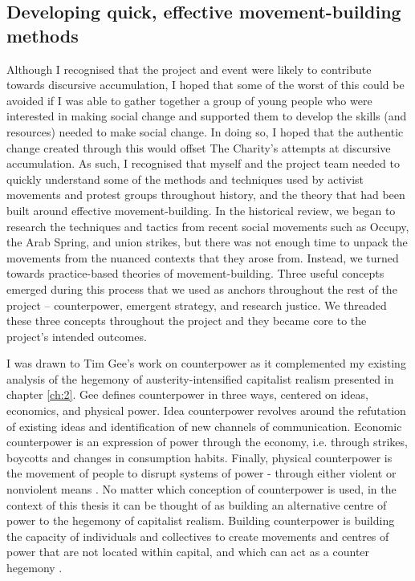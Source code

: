 \subsection{Developing quick, effective movement-building methods}
Although I recognised that the project and event were likely to contribute towards discursive accumulation, I hoped that some of the worst of this could be avoided if I was able to gather together a group of young people who were interested in making social change and supported them to develop the skills (and resources) needed to make social change. In doing so, I hoped that the authentic change created through this would offset The Charity's attempts at discursive accumulation. As such, I recognised that myself and the project team needed to quickly understand some of the methods and techniques used by activist movements and protest groups throughout history, and the theory that had been built around effective movement-building. In the historical review, we began to research the techniques and tactics from recent social movements such as Occupy, the Arab Spring, and union strikes, but there was not enough time to unpack the movements from the nuanced contexts that they arose from. Instead, we turned towards practice-based theories of movement-building. Three useful concepts emerged during this process that we used as anchors throughout the rest of the project – counterpower, emergent strategy, and research justice. We threaded these three concepts throughout the project and they became core to the project's intended outcomes. 

I was drawn to Tim Gee’s work on counterpower \citep{gee_counterpower:_2011} as it complemented my existing analysis of the hegemony of austerity-intensified capitalist realism presented in chapter \ref{ch:2}.  Gee defines counterpower in three ways, centered on ideas, economics, and physical power. Idea counterpower revolves around the refutation of existing ideas and identification of new channels of communication. Economic counterpower is an expression of power through the economy, i.e. through strikes, boycotts and changes in consumption habits. Finally, physical counterpower is the movement of people to disrupt systems of power - through either violent or nonviolent means \citep[13]{gee_counterpower:_2011}. No matter which conception of counterpower is used, in the context of this thesis it can be thought of as building an alternative centre of power to the hegemony of capitalist realism. Building counterpower is building the capacity of individuals and collectives to create movements and centres of power that are not located within capital, and which can act as a counter hegemony \citep[19]{gee_counterpower:_2011}. 

